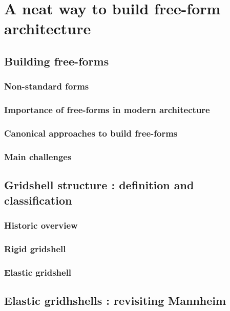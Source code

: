 \chapter{A neat way to build free-form architecture}

\section{Building free-forms}
	\subsection{Non-standard forms}
	\subsection{Importance of free-forms in modern architecture}
	\subsection{Canonical approaches to build free-forms}
	\subsection{Main challenges}

\section{Gridshell structure : definition and classification}
	\subsection{Historic overview}
	\subsection{Rigid gridshell}
	\subsection{Elastic gridshell}

\section{Elastic gridhshells : revisiting Mannheim}



